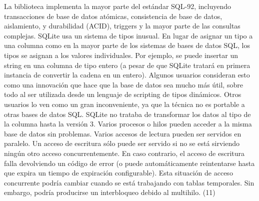 La biblioteca implementa la mayor parte del estándar SQL-92, incluyendo transacciones de base de datos atómicas, consistencia de base de datos, aislamiento, y durabilidad (ACID), triggers y la mayor parte de las consultas complejas.
SQLite usa un sistema de tipos inusual. En lugar de asignar un tipo a una columna como en la mayor parte de los sistemas de bases de datos SQL, los tipos se asignan a los valores individuales. Por ejemplo, se puede insertar un string en una columna de tipo entero (a pesar de que SQLite tratará en primera instancia de convertir la cadena en un entero). Algunos usuarios consideran esto como una innovación que hace que la base de datos sea mucho más útil, sobre todo al ser utilizada desde un lenguaje de scripting de tipos dinámicos. Otros usuarios lo ven como un gran inconveniente, ya que la técnica no es portable a otras bases de datos SQL. SQLite no trataba de transformar los datos al tipo de la columna hasta la versión 3.
Varios procesos o hilos pueden acceder a la misma base de datos sin problemas. Varios accesos de lectura pueden ser servidos en paralelo. Un acceso de escritura sólo puede ser servido si no se está sirviendo ningún otro acceso concurrentemente. En caso contrario, el acceso de escritura falla devolviendo un código de error (o puede automáticamente reintentarse hasta que expira un tiempo de expiración configurable). Esta situación de acceso concurrente podría cambiar cuando se está trabajando con tablas temporales. Sin embargo, podría producirse un interbloqueo debido al multihilo. (11)





